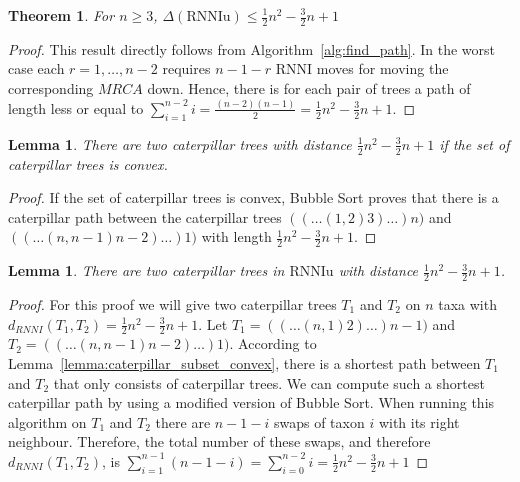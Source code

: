 \documentclass[11pt, a4paper]{article}
\newcommand{\rnni}{\mathrm{RNNI}}
\newcommand{\rnniu}{\mathrm{RNNIu}}
\newtheorem{theorem}[definition]{Theorem}
\newtheorem{lemma}[definition]{Lemma}
\begin{document}
\begin{theorem}
	For $n \geq 3$, $\Delta(\rnniu) \leq \frac{1}{2}n^2-\frac{3}{2}n+1$
\end{theorem}

\begin{proof}
	This result directly follows from Algorithm~\ref{alg:find_path}.
	In the worst case each $r = 1, \dots, n-2$ requires $n-1-r$ $\rnni$ moves for moving the corresponding $MRCA$ down.
	Hence, there is for each pair of trees a path of length less or equal to $\sum\limits_{i = 1}^{n-2} i = \frac{(n-2)(n-1)}{2} = \frac{1}{2}n^2-\frac{3}{2}n+1$.
\end{proof}


\begin{lemma}
	There are two caterpillar trees with distance $\frac{1}{2}n^2-\frac{3}{2}n+1$ if the set of caterpillar trees is convex.
	\label{lemma:caterpillar_diameter_convex}
\end{lemma}

\begin{proof}
	If the set of caterpillar trees is convex, Bubble Sort proves that there is a caterpillar path between the caterpillar trees
	$(( \dots (1,2)3)\dots)n)$ and $(( \dots (n,n-1)n-2)\dots)1)$ with length $\frac{1}{2}n^2-\frac{3}{2}n+1$.
\end{proof}

\begin{lemma}
	There are two caterpillar trees in $\rnniu$ with distance $\frac{1}{2}n^2-\frac{3}{2}n+1$.
	\label{conj:caterpillar_diameter}
\end{lemma}

\begin{proof}
    For this proof we will give two caterpillar trees $T_1$ and $T_2$ on $n$ taxa with $d_{RNNI}(T_1,T_2) = \frac{1}{2}n^2-\frac{3}{2}n+1$.
	Let $T_1 = (( \dots (n,1)2)\dots)n-1)$ and $T_2 = (( \dots (n,n-1)n-2)\dots)1)$.
    According to Lemma~\ref{lemma:caterpillar_subset_convex}, there is a shortest path between $T_1$ and $T_2$ that only consists of caterpillar trees.
    We can compute such a shortest caterpillar path by using a modified version of Bubble Sort.
    When running this algorithm on $T_1$ and $T_2$ there are $n-1-i$ swaps of taxon $i$ with its right neighbour.
    Therefore, the total number of these swaps, and therefore $d_{RNNI}(T_1,T_2)$, is $\sum\limits_{i=1}^{n-1}(n-1-i) = \sum\limits_{i=0}^{n-2}i = \frac{1}{2}n^2-\frac{3}{2}n+1$
\end{proof}
\end{document}
